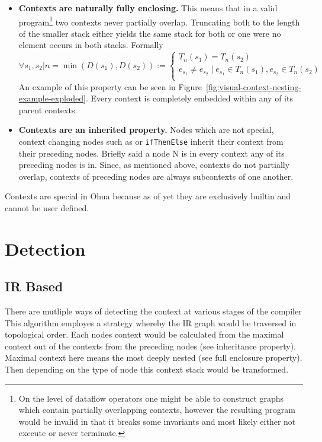 \begin{itemize}
  \item \textbf{Contexts are naturally fully enclosing.}
        This means that in a valid program\footnote{On the level of dataflow operators one might be able to construct graphs which contain partially overlapping contexts, however the resulting program would be invalid in that it breaks some invariants and most likely either not execute or never terminate.} two contexts never partially overlap.
        Truncating both to the length of the smaller stack either yields the same stack for both or one were no element occurs in both stacks.
        Formally
        \[
        \forall s_1, s_2 | n = \min(D(s_1), D(s_2)) :=
          \begin{cases}
            T_n(s_1) = T_n(s_2) \\
            e_{s_1} \neq e_{s_2} \mid e_{s_1} \in T_n(s_1), e_{s_2} \in T_n(s_2) \\
          \end{cases}
        \]
        An example of this property can be seen in Figure~\ref{fig:visual-context-nesting-example-exploded}.
        Every context is completely embedded within any of its parent contexts.

  \item \textbf{Contexts are an inherited property.}
        Nodes which are not special, context changing nodes such as \smap{} or \texttt{ifThenElse} inherit their context from their preceding nodes.
        Briefly said a node N is in every context any of its preceding nodes is in.
        Since, as mentioned above, contexts do not partially overlap, contexts of preceding nodes are always subcontexts of one another.
\end{itemize}

Contexts are special in Ohua because as of yet they are exclusively builtin and cannot be user defined.

\section{Detection}

\subsection{IR Based}

There are mutliple ways of detecting the context at various stages of the compiler
This algorithm employes a strategy whereby the IR graph would be traversed in topological order.
Each nodes context would be calculated from the maximal context out of the contexts from the preceding nodes (see inheritance property).
Maximal context here means the most deeply nested (see full enclosure property).
Then depending on the type of node this context stack would be transformed.

